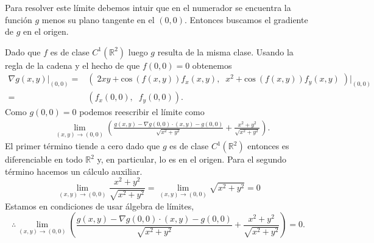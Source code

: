 
\begin{solution}
    Para resolver este límite debemos intuir que en el numerador se encuentra la función $g$ menos su plano tangente en el $(0,0)$. Entonces buscamos el gradiente de $g$ en el origen.

    Dado que $f$ es  de  clase \(C^1(\mathbb{R}^2)\) luego $g$  resulta de la misma clase.  Usando la regla de la cadena  y el hecho de que $f(0,0)=0$ obtenemos
    \begin{align*}
        \nabla g(x,y)\Big\rvert_{(0,0)}=& \left( \;2xy+\text{cos}\:(f(x,y))f_x(x,y),\;\; x^2+\text{cos}\:(f(x,y))f_y(x,y)\; \right) \Big\rvert_{(0,0)}\\
        =& \left( f_x(0,0),\;\; f_y(0,0) \right).
    \end{align*}
  Como $g(0,0)=0$ podemos reescribir el límite como
    \begin{align*}
        &\lim_{(x,y)\to(0,0)} \left(\frac{g(x,y)-\nabla g(0,0)\cdot(x,y)-g(0,0)}{\sqrt{x^2+y^2}}+\frac{x^2+y^2}{\sqrt{x^2+y^2}}\right).
    \end{align*}    
    El primer término tiende a cero dado que $g$ es  de  clase \(C^1(\mathbb{R}^2)\)  entonces es diferenciable en todo $\mathbb{R}^{2}$ y,  en particular, lo es en el origen.  Para el segundo término hacemos un cálculo auxiliar.
    \[
    \lim_{(x,y)\to(0,0)}\frac{x^2+y^2}{\sqrt{x^2+y^2}}=\lim_{(x,y)\to(0,0)}\sqrt{x^2+y^2}=0
    \]
  Estamos en condiciones de usar \'algebra de l\'imites,
   \[
        \therefore \lim_{(x,y)\to(0,0)} \left(\frac{g(x,y)-\nabla g(0,0)\cdot(x,y)-g(0,0)}{\sqrt{x^2+y^2}}+\frac{x^2+y^2}{\sqrt{x^2+y^2}}\right)=0.
   \]
\end{solution}


